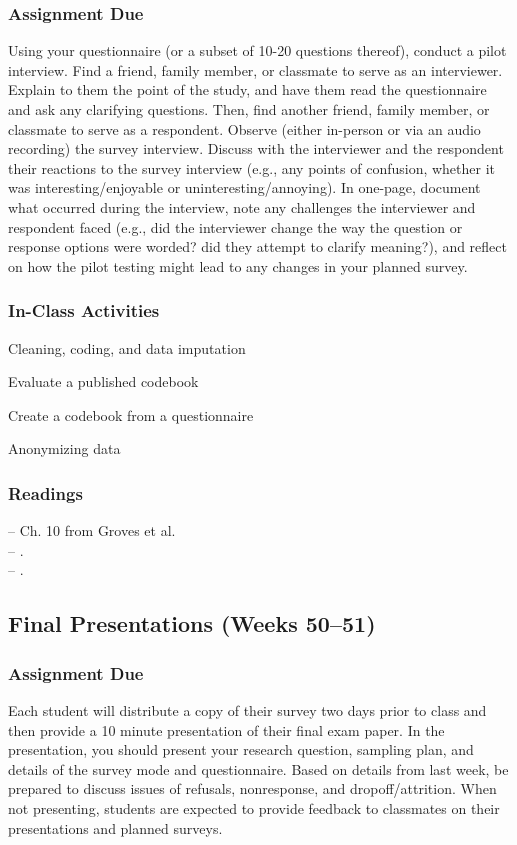\documentclass[11pt,a4paper]{article}
\newcommand{\reading}[2][]{\noindent -- {#1}\bibentry{#2}.\vspace{.25em}\\}
\newcommand{\textbook}[2][]{\noindent -- {#1} from Groves et al.\vspace{.25em}\\} %
\newcommand{\seealso}{\noindent \emph{See Also:}\\}
\begin{document}
\vspace{1em}
\subsubsection*{Assignment Due}
Using your questionnaire (or a subset of 10-20 questions thereof), conduct a pilot interview. Find a friend, family member, or classmate to serve as an interviewer. Explain to them the point of the study, and have them read the questionnaire and ask any clarifying questions. Then, find another friend, family member, or classmate to serve as a respondent. Observe (either in-person or via an audio recording) the survey interview. Discuss with the interviewer and the respondent their reactions to the survey interview (e.g., any points of confusion, whether it was interesting/enjoyable or uninteresting/annoying). In one-page, document what occurred during the interview, note any challenges the interviewer and respondent faced (e.g., did the interviewer change the way the question or response options were worded? did they attempt to clarify meaning?), and reflect on how the pilot testing might lead to any changes in your planned survey.

\subsubsection*{In-Class Activities}
\begin{itemize*}
\item Cleaning, coding, and data imputation
\item Evaluate a published codebook
\item Create a codebook from a questionnaire
\item Anonymizing data
\end{itemize*}

\subsubsection*{Readings}
\textbook[Ch. 10]{}
\reading{Simitis1994} %
\reading{DeBell2013} %


\clearpage
\subsection{Final Presentations (Weeks 50--51)}
\vspace{1em}
\subsubsection*{Assignment Due}
Each student will distribute a copy of their survey two days prior to class and then provide a 10 minute presentation of their final exam paper. In the presentation, you should present your research question, sampling plan, and details of the survey mode and questionnaire. Based on details from last week, be prepared to discuss issues of refusals, nonresponse, and dropoff/attrition. When not presenting, students are expected to provide feedback to classmates on their presentations and planned surveys.
\end{document}
